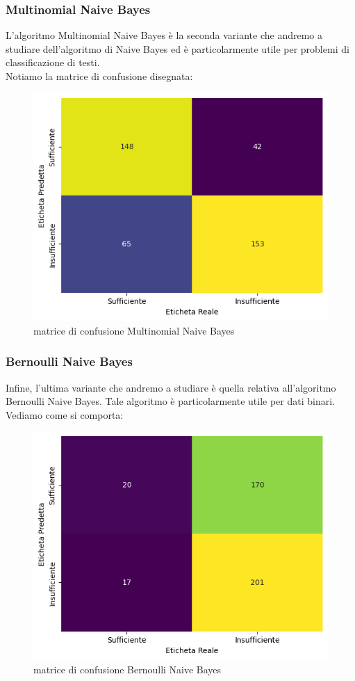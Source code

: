 \documentclass{article}
\begin{document}
\begin{titlepage}
        \subsubsection{Multinomial Naive Bayes}
        L'algoritmo Multinomial Naive Bayes è la seconda variante che andremo a studiare dell'algoritmo di Naive Bayes ed è particolarmente utile per problemi di classificazione di testi.\\ Notiamo la matrice di confusione disegnata:
        \begin{figure}[ht]
            \centering
            \includegraphics[width=0.6\linewidth]{confusion_matrix-MNB.png}
            \caption{  matrice di confusione Multinomial Naive Bayes}
            \label{fig:enter-label}
        \end{figure}
        
        \subsubsection{Bernoulli Naive Bayes}
        Infine, l'ultima variante che andremo a studiare è quella relativa all'algoritmo Bernoulli Naive Bayes. Tale algoritmo è particolarmente utile per dati binari. Vediamo come si comporta:
        \begin{figure}[ht]
            \centering
            \includegraphics[width=0.6\linewidth]{confusion_matrix-BNB.png}
            \caption{  matrice di confusione Bernoulli Naive Bayes}
            \label{fig:enter-label}
        \end{figure}


\end{titlepage}
\end{document}
